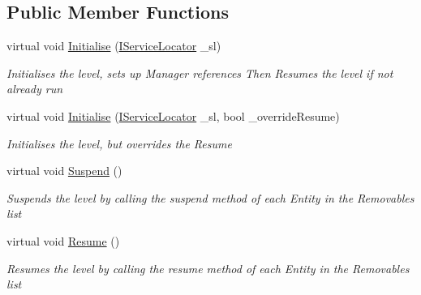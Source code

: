 \subsection*{Public Member Functions}
\begin{DoxyCompactItemize}
\item 
virtual void \mbox{\hyperlink{class_g_m_t_b_1_1_abstracts_1_1_level_a0048401bb0fb66b0fb0c19b3b25e4265}{Initialise}} (\mbox{\hyperlink{interface_g_m_t_b_1_1_interfaces_1_1_i_service_locator}{I\+Service\+Locator}} \+\_\+sl)
\begin{DoxyCompactList}\small\item\em Initialises the level, sets up Manager references Then Resumes the level if not already run \end{DoxyCompactList}\item 
virtual void \mbox{\hyperlink{class_g_m_t_b_1_1_abstracts_1_1_level_a68659ce713c8bd1ca17cebb001f0fd65}{Initialise}} (\mbox{\hyperlink{interface_g_m_t_b_1_1_interfaces_1_1_i_service_locator}{I\+Service\+Locator}} \+\_\+sl, bool \+\_\+override\+Resume)
\begin{DoxyCompactList}\small\item\em Initialises the level, but overrides the Resume \end{DoxyCompactList}\item 
virtual void \mbox{\hyperlink{class_g_m_t_b_1_1_abstracts_1_1_level_a087ddc187855a472e6d11692e86573fb}{Suspend}} ()
\begin{DoxyCompactList}\small\item\em Suspends the level by calling the suspend method of each Entity in the Removables list \end{DoxyCompactList}\item 
virtual void \mbox{\hyperlink{class_g_m_t_b_1_1_abstracts_1_1_level_a06d1dddb97da6fe34a062d2528a51390}{Resume}} ()
\begin{DoxyCompactList}\small\item\em Resumes the level by calling the resume method of each Entity in the Removables list \end{DoxyCompactList}\end{DoxyCompactItemize}
